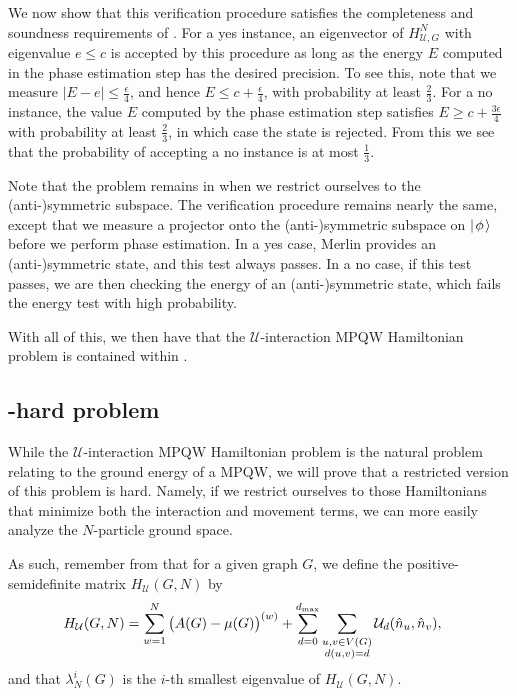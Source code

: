 \documentclass[../thesis-main/thesis-main]{subfiles}
\begin{document}
We now show that this verification procedure satisfies the completeness and soundness requirements of . For a yes instance, an eigenvector of $H_{\mathcal{U},G}^{N}$ with eigenvalue $e\leq c$ is accepted by this procedure as long as the energy $E$ computed in the phase estimation step has the desired precision. To see this, note that we measure $\left|E-e\right|\leq\frac{\epsilon}{4}$, and hence $E\leq c+\frac{\epsilon}{4}$, with probability at least $\frac{2}{3}$.  For a no instance, the value $E$ computed by the phase estimation step satisfies $E\geq c+\frac{3\epsilon}{4}$ with probability at least $\frac{2}{3}$, in which case the state is rejected. From this we see that the probability of accepting a no instance is at most $\frac{1}{3}$.

Note that the problem remains in \QMA when we restrict ourselves to the (anti-)symmetric subspace.  The verification procedure remains nearly the same, except that we measure a projector onto the (anti-)symmetric subspace on $|\mspace{2mu} \phi \mspace{2mu} \rangle$ before we perform phase estimation.  In a yes case, Merlin provides an (anti-)symmetric state, and this test always passes.  In a no case, if this test passes, we are then checking the energy of an (anti-)symmetric state, which fails the energy test with high probability.

With all of this, we then have that the $\mathcal{U}$-interaction MPQW Hamiltonian problem is contained within \QMA.


\subsection{\QMA-hard problem}

While the $\mathcal{U}$-interaction MPQW Hamiltonian problem is the natural problem relating to the ground energy of a MPQW, we will prove that a restricted version of this problem is \QMA hard.  Namely, if we restrict ourselves to those Hamiltonians that minimize both the interaction and movement terms, we can more easily analyze the $N$-particle ground space.

As such, remember from  that for a given graph $G$, we define the positive-semidefinite matrix $H_{\mathcal{U}}(G,N)$ by
\begin{align}
  H_{\mathcal{U}}(G,N) &= \sum_{w=1}^{N} \big( A(G) - \mu(G)\big)^{(w)} + \sum_{d=0}^{d_{\text{max}}} \sum_{\substack{u,v\in V(G)\\d(u,v) = d}} \mathcal{U}_d(\hat{n}_u,\hat{n}_v),
\end{align}
and that $\lambda_N^i(G)$ is the $i$-th smallest eigenvalue of $H_{\mathcal{U}}(G,N)$.
\end{document}
